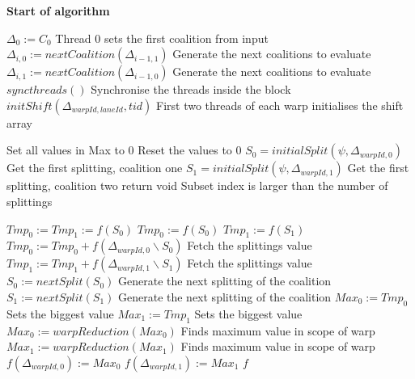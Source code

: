 \documentclass[a4paper, 12pt]{report}
\begin{document}
\textbf{Start of algorithm}
\begin{algorithmic}[1]
  \STATE $\Delta_0 := C_0$ \hfill Thread 0 sets the first coalition from input
    \STATE $\Delta_{i,0} := nextCoalition(\Delta_{i-1,1})$ \hfill Generate the
next coalitions to evaluate
    \STATE $\Delta_{i,1} := nextCoalition(\Delta_{i-1,0})$ \hfill Generate the
next coalitions to evaluate
  \ENDFOR 
\ENDIF
\STATE $syncthreads()$ \hfill Synchronise the threads inside the block 
  \STATE $initShift(\Delta_{warpId,laneId},tid)$ \hfill First two threads of
each warp initialises the shift array
\ENDIF

  \STATE Set all values in Max to 0 \hfill Reset the values to 0
  \STATE $S_0 = initialSplit(\psi,\Delta_{warpId,0})$  \hfill Get the first
splitting, coalition one
  \STATE $S_1 = initialSplit(\psi,\Delta_{warpId,1})$ \hfill  Get the first
splitting, coalition two
  \STATE \algorithmicif{$\psi \geq \Psi$} \algorithmicthen\space return void
\algorithmicendif \space \hfill Subset index is larger than the number of
splittings

      \STATE $Tmp_0 := Tmp_1 := f(S_0)$
    \ELSE
      \STATE $Tmp_0 := f(S_0)$
      \STATE $Tmp_1 := f(S_1)$
    \ENDIF
    \STATE $Tmp_0 := Tmp_0 + f(\Delta_{warpId,0}\backslash S_0)$ \hfill Fetch
the splittings value
    \STATE $Tmp_1 := Tmp_1 + f(\Delta_{warpId,1}\backslash S_1)$ \hfill Fetch
the splittings value
    \STATE $S_0 := nextSplit(S_0)$ \hfill Generate the next splitting of the
coalition
    \STATE $S_1 := nextSplit(S_1)$ \hfill Generate the next splitting of the
coalition
   \STATE {} \algorithmicthen\space $ Max_0
:= Tmp_0$ \algorithmicendif \hfill Sets the biggest value 
  \STATE  {} \algorithmicthen\space $ Max_1
:= Tmp_1$ \algorithmicendif \hfill Sets the biggest value 
\ENDFOR
\STATE $Max_0 := warpReduction(Max_0)$ \hfill Finds maximum value in scope of
warp
\STATE $Max_1 := warpReduction(Max_1)$ \hfill Finds maximum value in scope of
warp
\STATE  {}
\algorithmicthen\space $f(\Delta_{warpId,0}) := Max_0$ \algorithmicendif 
\STATE  {}
\algorithmicthen\space $f(\Delta_{warpId,1}) := Max_1$ \algorithmicendif 
\ENDIF
\RETURN $f$
\end{algorithmic}
\end{document}
